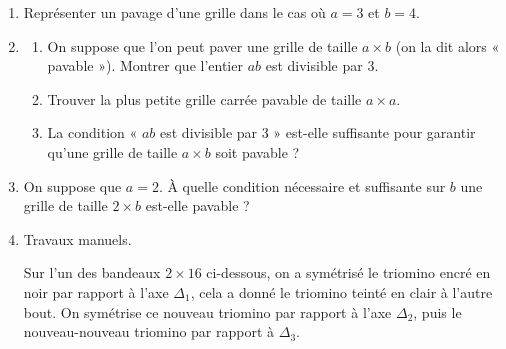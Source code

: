 \begin{enumerate}
\item Représenter un pavage d'une grille dans le cas où $a = 3$ et $b = 4$.



\item \begin{enumerate}
\item On suppose que l'on peut paver une grille de taille $a \times b$ (on la dit alors « pavable »). Montrer que l'entier $ab$ est divisible par 3.



\item Trouver la plus petite grille carrée pavable de taille $a \times a$.



\item La condition « $ab$ est divisible par 3 » est-elle suffisante pour garantir qu'une grille de taille $a \times b$ soit pavable ?


\end{enumerate}

\item On suppose que $a = 2$. À quelle condition nécessaire et suffisante sur $b$ une grille de taille $2 \times b$ est-elle pavable ?



\item Travaux manuels.

Sur l'un des bandeaux $2 \times 16$ ci-dessous, on a symétrisé le triomino encré en noir par rapport à l'axe $\Delta_1$, cela a donné le triomino teinté en clair à l'autre bout. On symétrise ce nouveau triomino par rapport à l'axe $\Delta_2$, puis le nouveau-nouveau triomino par rapport à $\Delta_3$.


\begin{center}
\end{center}
\end{enumerate}
